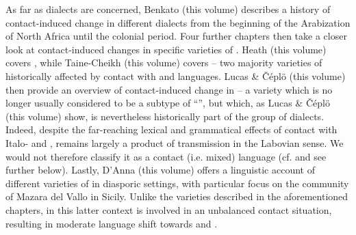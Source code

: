 \documentclass[output=paper]{langsci/langscibook}
\begin{document}
As far as  dialects are concerned, Benkato (this volume) describes a history of contact-induced change in different  dialects from the beginning of the {Arabization} of North Africa until the {colonial} period. Four further chapters then take a closer look at contact-induced changes in specific varieties of  . Heath (this volume) covers , while Taine-Cheikh (this volume) covers  -- two majority varieties of  historically affected by contact with  and  languages. Lucas \& Čéplö (this volume) then provide an overview of contact-induced change in  -- a variety which is no longer usually considered to be a subtype of ``'', but which, as Lucas \& Čéplö (this volume) show, is nevertheless historically part of the  group of  dialects. Indeed, despite the far-reaching lexical and grammatical effects of contact with Italo- and ,  remains largely a product of {transmission} in the Labovian sense. We would not therefore classify it as a contact (i.e. mixed) language (cf. \citealt{stolz2003} and see further below). Lastly, D’Anna (this volume) offers a linguistic account of different varieties of  in diasporic settings, with particular focus on the  community of {Mazara del Vallo} in {Sicily}. Unlike the  varieties described in the aforementioned chapters, in this latter context  is involved in an unbalanced contact situation, resulting in moderate {language shift} towards  and .
\end{document}
